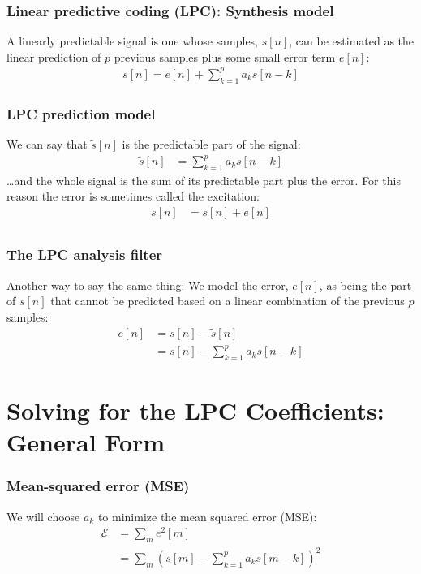 \documentclass{beamer}
\begin{document}
\begin{frame}
  \frametitle{Linear predictive coding (LPC): Synthesis model}

  A linearly predictable signal is one whose samples, $s[n]$, can be estimated
  as the linear prediction of $p$ previous samples plus some small error term $e[n]$:
  \begin{align*}
    s[n] = e[n]+\sum_{k=1}^p a_k s[n-k]
  \end{align*}
\end{frame}

\begin{frame}
  \frametitle{LPC prediction model}

  We can say that $\tilde{s}[n]$ is the predictable part of the signal:
  \begin{align*}
    \tilde{s}[n] &= \sum_{k=1}^p a_k s[n-k]
  \end{align*}
  \ldots and the whole signal is the sum of its predictable part plus the error.
  For this reason the error is sometimes called the excitation:
  \begin{align*}
    s[n] &= \tilde{s}[n]+e[n]\\
  \end{align*}
\end{frame}

\begin{frame}
  \frametitle{The LPC analysis filter}

  Another way to say the same thing: We model the error, $e[n]$,
  as being the part of $s[n]$ that cannot be predicted based on a
  linear combination of the previous $p$ samples:
  \begin{align*}
    e[n] &= s[n]-\tilde{s}[n]\\
    &= s[n]-\sum_{k=1}^p a_k s[n-k]
  \end{align*}
\end{frame}

\section[Coefficients]{Solving for the LPC Coefficients: General Form}

\begin{frame}
  \frametitle{Mean-squared error (MSE)}

  We will choose $a_k$ to minimize the mean squared error (MSE):
  \begin{align*}
    \mathcal{E} &= \sum_m e^2[m]\\
    &= \sum_m \left(s[m]-\sum_{k=1}^p a_ks[m-k]\right)^2
  \end{align*}
\end{frame}
\end{document}
